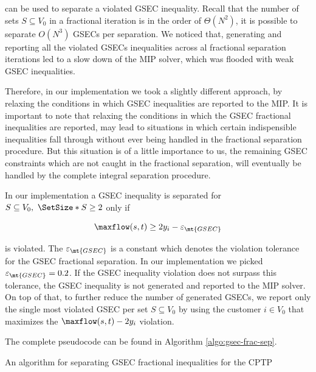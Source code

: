 can be used to separate a violated GSEC inequality.
Recall that the number of sets $S \subseteq V_0$ in a fractional iteration is in the order of $\Theta(N^2)$, it is possible to separate $O(N^3)$ GSECs per separation.
We noticed that, generating and reporting all the violated GSECs inequalities across al fractional separation iterations led to a slow down of the MIP solver, which was flooded with weak GSEC inequalities.

Therefore, in our implementation we took a slightly different approach, by relaxing the conditions in which GSEC inequalities are reported to the MIP.
It is important to note that relaxing the conditions in which the GSEC fractional inequalities are reported, may lead to situations in which certain indispensible inequalities fall through without ever being handled in the fractional separation procedure.
But this situation is of a little importance to us, the remaining GSEC constraints which are not caught in the fractional separation, will eventually be handled by the complete integral separation procedure.

In our implementation a GSEC inequality is separated for $S \subseteq V_0,\ \SetSize*{S} \ge 2$ only if

\begin{equation}
	\maxflow(s, t) \ge 2 y_i - \varepsilon_{\mt{GSEC}}
\end{equation}

is violated.
The $\varepsilon_{\mt{GSEC}}$ is a constant which denotes the violation tolerance for the GSEC fractional separation.
In our implementation we picked $\varepsilon_{\mt{GSEC}} = 0.2$.
If the GSEC inequality violation does not surpass this tolerance, the GSEC inequality is not generated and reported to the MIP solver.
On top of that, to further reduce the number of generated GSECs, we report only the single most violated GSEC per set $S \subseteq V_0$ by using the customer $i \in V_0$ that maximizes the $\maxflow(s, t) - 2 y_i$ violation.

The complete pseudocode can be found in Algorithm \ref{algo:gsec-frac-sep}.

\begin{algorithm}
	\caption{An algorithm for separating GSEC fractional inequalities for the CPTP}
	\label{algo:gsec-frac-sep}
	
\end{algorithm}



